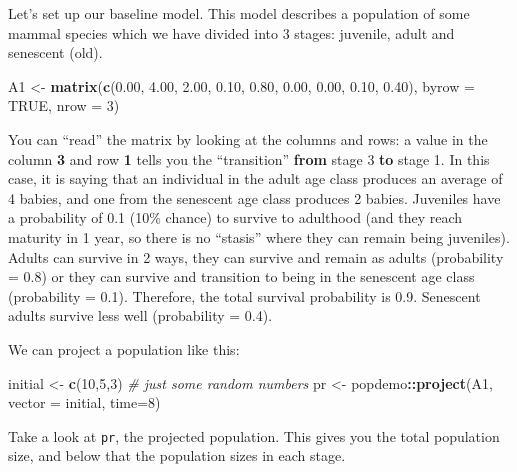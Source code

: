 \documentclass[
  a4paper]{book}
\newenvironment{Shaded}{\begin{snugshade}}{\end{snugshade}}
\newcommand{\AttributeTok}[1]{\textcolor[rgb]{0.13,0.29,0.53}{#1}}
\newcommand{\CommentTok}[1]{\textcolor[rgb]{0.56,0.35,0.01}{\textit{#1}}}
\newcommand{\ConstantTok}[1]{\textcolor[rgb]{0.56,0.35,0.01}{#1}}
\newcommand{\DecValTok}[1]{\textcolor[rgb]{0.00,0.00,0.81}{#1}}
\newcommand{\FloatTok}[1]{\textcolor[rgb]{0.00,0.00,0.81}{#1}}
\newcommand{\FunctionTok}[1]{\textcolor[rgb]{0.13,0.29,0.53}{\textbf{#1}}}
\newcommand{\NormalTok}[1]{#1}
\newcommand{\OtherTok}[1]{\textcolor[rgb]{0.56,0.35,0.01}{#1}}
\newcommand{\SpecialCharTok}[1]{\textcolor[rgb]{0.81,0.36,0.00}{\textbf{#1}}}
\begin{document}
Let's set up our baseline model. This model describes a population of some mammal species which we have divided into 3 stages: juvenile, adult and senescent (old).

\begin{Shaded}
\begin{Highlighting}[]
\NormalTok{A1 }\OtherTok{\textless{}{-}} \FunctionTok{matrix}\NormalTok{(}\FunctionTok{c}\NormalTok{(}\FloatTok{0.00}\NormalTok{, }\FloatTok{4.00}\NormalTok{, }\FloatTok{2.00}\NormalTok{, }
               \FloatTok{0.10}\NormalTok{, }\FloatTok{0.80}\NormalTok{, }\FloatTok{0.00}\NormalTok{, }
               \FloatTok{0.00}\NormalTok{, }\FloatTok{0.10}\NormalTok{, }\FloatTok{0.40}\NormalTok{), }
            \AttributeTok{byrow =} \ConstantTok{TRUE}\NormalTok{, }\AttributeTok{nrow =} \DecValTok{3}\NormalTok{)}
\end{Highlighting}
\end{Shaded}

You can ``read'' the matrix by looking at the columns and rows: a value in the column \textbf{3} and row \textbf{1} tells you the ``transition'' \textbf{from} stage 3 \textbf{to} stage 1. In this case, it is saying that an individual in the adult age class produces an average of 4 babies, and one from the senescent age class produces 2 babies. Juveniles have a probability of 0.1 (10\% chance) to survive to adulthood (and they reach maturity in 1 year, so there is no ``stasis'' where they can remain being juveniles). Adults can survive in 2 ways, they can survive and remain as adults (probability = 0.8) or they can survive and transition to being in the senescent age class (probability = 0.1). Therefore, the total survival probability is 0.9. Senescent adults survive less well (probability = 0.4).

We can project a population like this:

\begin{Shaded}
\begin{Highlighting}[]
\NormalTok{initial }\OtherTok{\textless{}{-}} \FunctionTok{c}\NormalTok{(}\DecValTok{10}\NormalTok{,}\DecValTok{5}\NormalTok{,}\DecValTok{3}\NormalTok{) }\CommentTok{\# just some random numbers}
\NormalTok{pr }\OtherTok{\textless{}{-}}\NormalTok{ popdemo}\SpecialCharTok{::}\FunctionTok{project}\NormalTok{(A1, }\AttributeTok{vector =}\NormalTok{ initial, }\AttributeTok{time=}\DecValTok{8}\NormalTok{)}
\end{Highlighting}
\end{Shaded}

Take a look at \texttt{pr}, the projected population. This gives you the total population size, and below that the population sizes in each stage.
\end{document}
